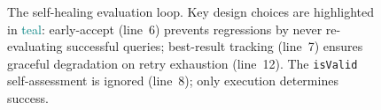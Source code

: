 \documentclass{article}
\begin{document}
\begin{figure}[ht]
\caption{The self-healing evaluation loop. Key design choices are highlighted in \textcolor{teal}{teal}: early-accept (line~6) prevents regressions by never re-evaluating successful queries; best-result tracking (line~7) ensures graceful degradation on retry exhaustion (line~12). The \texttt{isValid} self-assessment is ignored (line~8); only execution determines success.}
\label{alg:selfhealing}
\end{figure}
\end{document}
